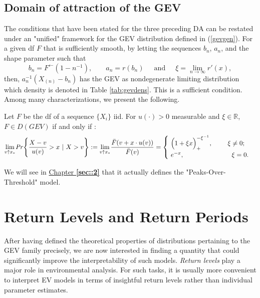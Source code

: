 \subsection{Domain of attraction of the GEV}
The conditions that have been stated for the three preceding DA can be restated under an "unified" framework for the GEV distribution defined in (\ref{gevgen}).
For a given df $F$ that is sufficiently smooth, by letting the sequences $b_n$, $a_n$, and the shape parameter such that
\begin{equation*}
b_n=F^{\leftarrow}(1-n^{-1})\text{, } \ \ \ \ \ \ \ \ a_n=r(b_n) \ \ \ \ \ \text{ and } \ \ \ \ \ \xi=\displaystyle{\lim_{n \to \infty}}r'(x),
\end{equation*}
 then, $a_n^{-1}(X_{(n)}-b_n)$ has the GEV as nondegenerate limiting distribution which density is denoted in Table \ref{tab:gevdens}. This is a sufficient condition.
 Among many characterizations, we present the following. 
\begin{theorem}
	Let $F$ be the df of a sequence $\{X_i\}$ iid. For $u(\cdot)>0$ measurable and $\xi\in\mathbb{R}$,\\ $F\in D(GEV)$ if and only if :
	\begin{equation}
	\displaystyle{\lim_{v \uparrow x_*}} \text{\emph{Pr}} \Bigg\{\frac{X-v}{u(v)}>x \ | \ X>v\Bigg\}:=\displaystyle{\lim_{v \uparrow x_*}}\frac{\bar{F}(v+x\cdot u(v))}{\bar{F}(v)}=\begin{cases}
	\ \Big(1+\xi x\Big)_+^{-\xi^{-1}}, \ \ \ \ \ \ \ \xi\neq 0;    \\
	\  e^{-x}, \ \ \ \ \ \ \ \ \ \ \ \ \ \ \ \ \qquad \xi=0.
	\end{cases}
	\end{equation}
\end{theorem}
We will see in \hyperref[sec::2]{Chapter \textbf{\ref{sec::2}}} that it actually defines the "Peaks-Over-Threshold" model.

\section{Return Levels and Return Periods}\label{rlgev}


After having defined the theoretical properties of distributions pertaining to the GEV family precisely, we are now interested in finding a quantity that could significantly improve the interpretability of such models.
\emph{Return levels} play a major role in environmental analysis. For such tasks, it is usually more convenient to interpret EV models in terms of insightful return levels rather than individual parameter estimates. 

